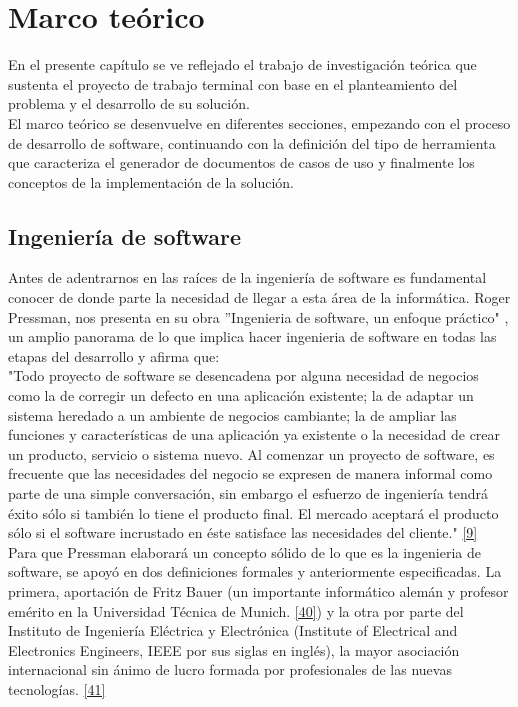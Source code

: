 \chapter{Marco teórico} \label{cap:dos}

En el presente capítulo se ve reflejado el trabajo de investigación teórica que sustenta el proyecto de trabajo terminal con base en el planteamiento del problema y el desarrollo de su solución.\\

El marco teórico se desenvuelve en diferentes secciones, empezando con el proceso de desarrollo de software, continuando con la definición del tipo de herramienta que caracteriza el generador de documentos de casos de uso y finalmente los conceptos de la implementación de la solución.

\section{Ingeniería de software}

Antes de adentrarnos en las raíces de la ingeniería de software es fundamental conocer de donde parte la necesidad de llegar a esta área de la informática. Roger Pressman, nos presenta en su obra ''Ingenieria de software, un enfoque práctico" , un amplio panorama de lo que implica hacer ingenieria de software en todas las etapas del desarrollo y afirma que:\\ 

"Todo proyecto de software se desencadena por alguna necesidad de negocios como la de corregir un defecto en una aplicación existente; la de adaptar un sistema heredado a un ambiente de negocios cambiante; la de ampliar las funciones y características de una aplicación ya existente o la necesidad de crear un producto, servicio o sistema nuevo. Al comenzar un proyecto de software, es frecuente que las necesidades del negocio se expresen de manera informal como parte de una simple conversación, sin embargo el esfuerzo de ingeniería tendrá éxito sólo si también lo tiene el producto final. El mercado aceptará el producto sólo si el software incrustado en éste satisface las necesidades del cliente." \hyperlink{b09}{[9]}\\

Para que Pressman elaborará un concepto sólido de lo que es la ingenieria de software, se apoyó en dos definiciones formales y anteriormente especificadas. La primera, aportación de Fritz Bauer (un importante informático alemán y profesor emérito en la Universidad Técnica de Munich. \hyperlink{b40}{[40]}) y la otra por parte del Instituto de Ingeniería Eléctrica y Electrónica (Institute of Electrical and Electronics Engineers,  IEEE por sus siglas en inglés), la mayor asociación internacional sin ánimo de lucro formada por profesionales de las nuevas tecnologías. \hyperlink{b41}{[41]} \\

